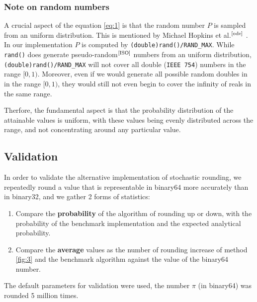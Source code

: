 \documentclass[a4paper]{article} %
\begin{document}
\begin{multicols}{2}
\subsubsection{Note on random numbers}
A crucial aspect of the equation \ref{eq:1} is that the random number $P$ is sampled from an uniform distribution. This is mentioned by Michael Hopkins et al.$^\text{\cite{ode}}$ . In our implementation $P$ is computed by \verb|(double)rand()/RAND_MAX|. While \verb|rand()| does generate pseudo-random$^\text{\cite{ISO}}$ numbers from an uniform distribution, \verb|(double)rand()/RAND_MAX| will not cover all double (\verb|IEEE 754|) numbers in the range $[0, 1)$. Moreover, even if we would generate all possible random doubles in in the range $[0, 1)$, they would still not even begin to cover the infinity of reals in the same range.
\par
Therfore, the fundamental aspect is that the probability distribution of the attainable values is uniform, with these values being evenly distributed across the range, and not concentrating around any particular value.

\subsection{Validation}
In order to validate the alternative implementation of stochastic rounding, we repeatedly round a value that is representable in binary64 more accurately than in binary32, and we gather 2 forms of statistics:
\begin{enumerate}
    \item Compare the \textbf{probability} of the algorithm of rounding up or down, with the probability of the benchmark implementation and the expected analytical probability.
    \item Compare the \textbf{average} values as the number of rounding increase of method \ref{fig:3} and the benchmark algorithm against the value of the binary64 number.
\end{enumerate}
The default parameters for validation were used, the number $\pi$ (in binary64) was rounded 5 million times.
\columnbreak

\end{multicols}
\end{document}
